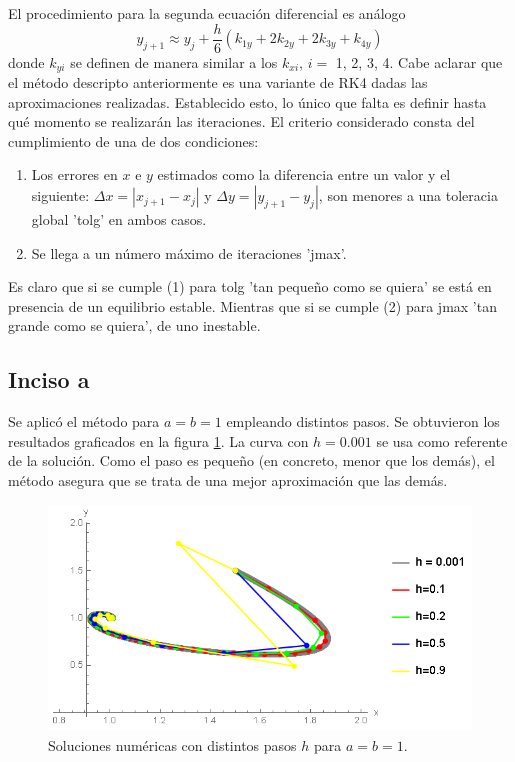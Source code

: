 \documentclass[aps,prb,twocolumn,superscriptaddress,floatfix,longbibliography]{revtex4-2}
\newcounter{para}
\begin{document}
El procedimiento para la segunda ecuación diferencial es análogo
\[y_{j+1} \approx y_j + \frac{h}{6} (k_{1y} + 2k_{2y} + 2k_{3y} + k_{4y})\]
donde $k_{yi}$ se definen de manera similar a los $k_{xi}$, $i = $ 1, 2, 3, 4. Cabe aclarar que el método descripto anteriormente es una variante de RK4 dadas las aproximaciones realizadas. Establecido esto, lo único que falta es definir hasta qué momento se realizarán las iteraciones. El criterio considerado consta del cumplimiento de una de dos condiciones:
\begin{enumerate}
    \item Los errores en $x$ e $y$ estimados como la diferencia entre un valor y el siguiente: $\Delta x = |x_{j+1} - x_j|$ y $\Delta y = |y_{j+1} - y_j|$, son menores a una toleracia global 'tolg' en ambos casos.
    \item Se llega a un número máximo de iteraciones 'jmax'.
\end{enumerate}
Es claro que si se cumple (1) para tolg 'tan pequeño como se quiera' se está en presencia de un equilibrio estable. Mientras que si se cumple (2) para jmax 'tan grande como se quiera', de uno inestable.

\subsection{Inciso a}
Se aplicó el método para $a = b = 1$ empleando distintos pasos. Se obtuvieron los resultados graficados en la figura \ref{fig:3_a}. La curva con $h = 0.001$ se usa como referente de la solución. Como el paso es pequeño (en concreto, menor que los demás), el método asegura que se trata de una mejor aproximación que las demás.

\begin{figure}[h]
    \includegraphics[clip=true,width=\columnwidth]{3_a.png}
    \caption{Soluciones numéricas con distintos pasos $h$ para $a = b = 1$.}
     \label{fig:3_a}
\end{figure}
\end{document}
